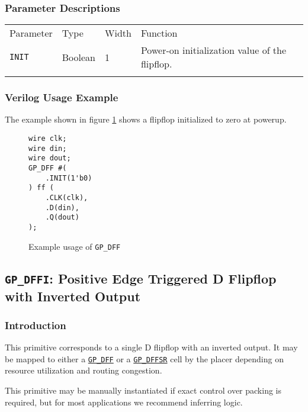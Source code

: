 \documentclass[11pt]{article}
\newcommand{\tokenstyle}[1]{\texttt{#1}}
\newcommand{\whenstyle}[1]{{\fontseries{sb}\selectfont#1}}
\newcommand{\tokenref}[2]{\hyperref[#2]{\tokenstyle{#1}}}
\newcommand{\thinhline}{\Xhline{1\arrayrulewidth}}
\newcommand{\thickhline}{\Xhline{2.5\arrayrulewidth}}
\begin{document}
\subsubsection{Parameter Descriptions}

\begin{tabularx}{\textwidth}{lllX}
\thinhline
\whenstyle{Parameter} & \whenstyle{Type} & \whenstyle{Width} & \whenstyle{Function} \\
\thickhline
\tokenstyle{INIT} & Boolean & 1 & Power-on initialization value of the flipflop. \\
\thinhline
\end{tabularx}

\subsubsection{Verilog Usage Example}

The example shown in figure \ref{gp-dff-example} shows a flipflop initialized to zero at powerup.

\begin{figure}[h]
\begin{lstlisting}
wire clk;
wire din;
wire dout;
GP_DFF #(
	.INIT(1'b0)
) ff (
	.CLK(clk),
	.D(din),
	.Q(dout)
);
\end{lstlisting}
\caption{Example usage of \tokenstyle{GP\_DFF}}
\label{gp-dff-example}
\end{figure}


\pagebreak
\subsection{\tokenstyle{GP\_DFFI}: Positive Edge Triggered D Flipflop with Inverted Output}
\label{gp-dff}

\subsubsection{Introduction}
This primitive corresponds to a single D flipflop with an inverted output. It may be mapped to either a
\tokenref{GP\_DFF}{gp-dff} or a \tokenref{GP\_DFFSR}{gp-dffsr} cell by the placer depending on resource utilization and
routing congestion.

This primitive may be manually instantiated if exact control over packing is required, but for most applications we
recommend inferring logic.
\end{document}
